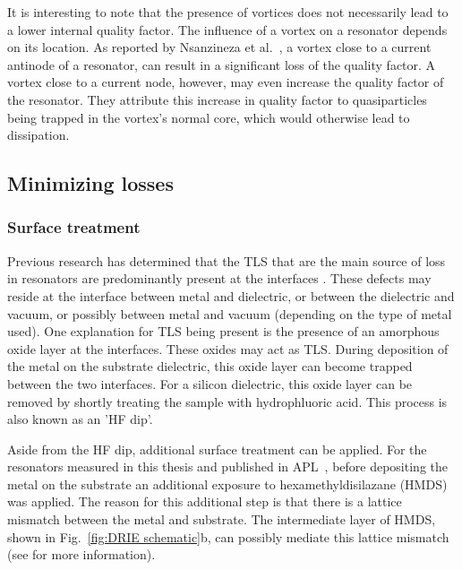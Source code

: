       It is interesting to note that the presence of vortices does not necessarily lead to a lower internal quality factor. The influence of a vortex on a resonator depends on its location. As reported by Nsanzineza et al.~\cite{nsanzineza2014trapping}, a vortex close to a current antinode of a resonator, can result in a significant loss of the quality factor. A vortex close to a current node, however, may even increase the quality factor of the resonator. They attribute this increase in quality factor to quasiparticles being trapped in the vortex's normal core, which would otherwise lead to dissipation.





  \subsection{Minimizing losses}

  \subsubsection{Surface treatment}

  Previous research has determined that the TLS that are the main source of loss in resonators are predominantly present at the interfaces \cite{gao2008experimental}. These defects may reside at the interface between metal and dielectric, or between the dielectric and vacuum, or possibly between metal and vacuum (depending on the type of metal used). One explanation for TLS being present is the presence of an amorphous oxide layer at the interfaces. These oxides may act as TLS. During deposition of the metal on the substrate dielectric, this oxide layer can become trapped between the two interfaces. For a silicon dielectric, this oxide layer can be removed by shortly treating the sample with hydrophluoric acid. This process is also known as an 'HF dip'.

  Aside from the HF dip, additional surface treatment can be applied. For the resonators measured in this thesis and published in APL~\cite{bruno2015reducing}, before depositing the metal on the substrate an additional exposure to hexamethyldisilazane (HMDS) was applied. The reason for this additional step is that there is a lattice mismatch between the metal and substrate. The intermediate layer of HMDS, shown in Fig.~\ref{fig:DRIE schematic}b, can possibly mediate this lattice mismatch (see \cite{bruno2015reducing} for more information).


